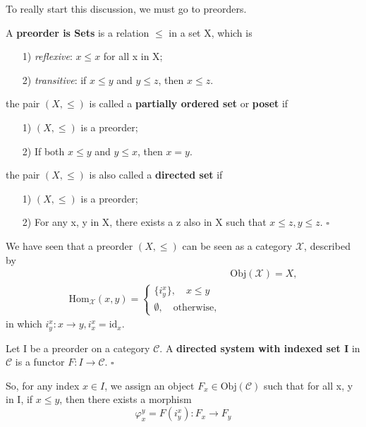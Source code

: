 \documentclass[../category_theory.tex]{subfiles}
\begin{document}
To really start this discussion, we must go to preorders.
\begin{def*}
	A \textbf{preorder is Sets} is a relation \(\leq \) in a set X, which is
	\begin{itemize}
		\item[1)] \textit{reflexive}: \(x\leq x\) for all x in X;
		\item[2)] \textit{transitive}: if \(x\leq y\) and \(y\leq z\),  then \(x\leq z\).
	\end{itemize}
	the pair \((X, \leq )\) is called a \textbf{partially ordered set} or \textbf{poset} if
	\begin{itemize}
		\item[1)] \((X, \leq )\) is a preorder;
		\item[2)] If both \(x\leq y\) and \(y\leq x\), then \(x=y\).
	\end{itemize}
	the pair \((X, \leq )\) is also called a \textbf{directed set} if
	\begin{itemize}
		\item[1)] \((X, \leq )\) is a preorder;
		\item[2)] For any x, y in X, there exists a z also in X such that \(x\leq z, y\leq z\). \(\square\)
	\end{itemize}
\end{def*}
We have seen that a preorder \((X, \leq )\) can be seen as a category \(\mathcal{X}\), described by
\begin{align*}
	 & \mathrm{Obj}(\mathcal{X})=X, \\
	\mathrm{Hom}_{\mathcal{X}}(x, y) = \left\{\begin{array}{ll}
		                                          \{i_{y}^{x}\}, \quad x\leq y \\
		                                          \emptyset , \quad \text{otherwise},
	                                          \end{array}\right.
\end{align*}
in which \(i_{y}^{x}:x\rightarrow y, i_{x}^{x}=\mathrm{id}_{x}\).
\begin{def*}
	Let I be a preorder on a category \(\mathcal{C}\). A \textbf{directed system with indexed set I} in \(\mathcal{C}\) is a functor \(F:I\rightarrow \mathcal{C}\). \(\square\)
\end{def*}
So, for any index \(x\in I\), we assign an object \(F_{x}\in \mathrm{Obj}(\mathcal{C})\) such that for all x, y in I, if \(x\leq y\), then there exists a morphism
\[
	\varphi_{x}^{y}=F(i_{y}^{x}):F_{x}\rightarrow F_{y}
\]
\end{document}
